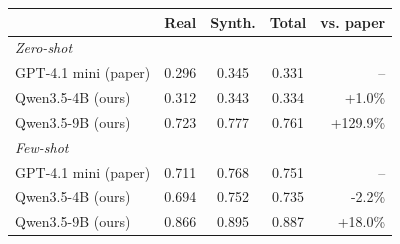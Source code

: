 \begin{tabular}{lcccr}
\toprule
 & Real & Synth. & Total & vs. paper \\
\midrule
\textit{Zero-shot} & & & & \\
GPT-4.1 mini (paper) & 0.296 & 0.345 & 0.331 & -- \\
Qwen3.5-4B (ours) & 0.312 & 0.343 & 0.334 & +1.0\% \\
Qwen3.5-9B (ours) & 0.723 & 0.777 & 0.761 & +129.9\% \\
\textit{Few-shot} & & & & \\
GPT-4.1 mini (paper) & 0.711 & 0.768 & 0.751 & -- \\
Qwen3.5-4B (ours) & 0.694 & 0.752 & 0.735 & -2.2\% \\
Qwen3.5-9B (ours) & 0.866 & 0.895 & 0.887 & +18.0\% \\
\bottomrule
\end{tabular}
